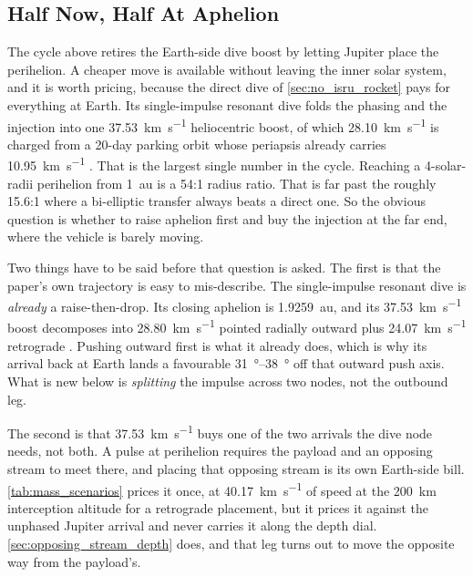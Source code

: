 \documentclass{article}
\begin{document}
\subsection{Half Now, Half At Aphelion}\label{sec:split_dive}
The cycle above retires the Earth-side dive boost by letting Jupiter place the perihelion. A cheaper move is available without leaving the inner solar system, and it is worth pricing, because the direct dive of \autoref{sec:no_isru_rocket} pays for everything at Earth. Its single-impulse resonant dive folds the phasing and the injection into one \SI{37.53}{\kilo\meter\per\second} heliocentric boost, of which \SI{28.10}{\kilo\meter\per\second} is charged from a 20-day parking orbit whose periapsis already carries \SI{10.95}{\kilo\meter\per\second} \cite{Katz_aim_is_all_you_need_2025}. That is the largest single number in the cycle. Reaching a 4-solar-radii perihelion from \SI{1}{\astronomicalunit} is a 54:1 radius ratio. That is far past the roughly 15.6:1 where a bi-elliptic transfer always beats a direct one. So the obvious question is whether to raise aphelion first and buy the injection at the far end, where the vehicle is barely moving.

Two things have to be said before that question is asked. The first is that the paper's own trajectory is easy to mis-describe. The single-impulse resonant dive is \emph{already} a raise-then-drop. Its closing aphelion is \SI{1.9259}{\astronomicalunit}, and its \SI{37.53}{\kilo\meter\per\second} boost decomposes into \SI{28.80}{\kilo\meter\per\second} pointed radially outward plus \SI{24.07}{\kilo\meter\per\second} retrograde \cite{Katz_aim_is_all_you_need_2025}. Pushing outward first is what it already does, which is why its arrival back at Earth lands a favourable \SIrange{31}{38}{\degree} off that outward push axis. What is new below is \emph{splitting} the impulse across two nodes, not the outbound leg.

The second is that \SI{37.53}{\kilo\meter\per\second} buys one of the two arrivals the dive node needs, not both. A pulse at perihelion requires the payload and an opposing stream to meet there, and placing that opposing stream is its own Earth-side bill. \autoref{tab:mass_scenarios} prices it once, at \SI{40.17}{\kilo\meter\per\second} of speed at the \SI{200}{\kilo\meter} interception altitude for a retrograde placement, but it prices it against the unphased Jupiter arrival and never carries it along the depth dial. \autoref{sec:opposing_stream_depth} does, and that leg turns out to move the opposite way from the payload's.
\end{document}
